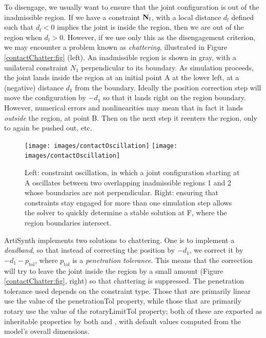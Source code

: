 To disengage, we usually want to ensure that the joint configuration
is out of the inadmissible region. If we have a constraint ${\bf N}_l$,
with a local distance $d_l$ defined such that $d_l < 0$ implies the
joint is inside the region, then we are out of the region when
$d_l > 0$.  However, if we use only this as the disengagement
criterion, we may encounter a problem known as {\it chattering},
illustrated in Figure \ref{contactChatter:fig} (left). An inadmissible
region is shown in gray, with a unilateral constraint $N_1$
perpendicular to its boundary. As simulation proceeds, the joint lands
inside the region at an initial point A at the lower left, at a
(negative) distance $d_1$ from the boundary. Ideally the position
correction step will move the configuration by $-d_1$ so that it lands
right on the region boundary. However, numerical errors and
nonlinearities may mean that in fact it lands {\it outside} the
region, at point B. Then on the next step it reenters the region, only
to again be pushed out, etc.

\begin{figure}[th]
\begin{center}
\iflatexml
 \texttt{[image: images/contactOscillation]}
\else
 \texttt{[image: images/contactOscillation]}
\fi
\end{center}
\caption{Left: constraint oscillation, in which a joint configuration
starting at A oscillates between two overlapping inadmissible
regions 1 and 2 whose boundaries are not perpendicular. Right:
ensuring that constraints stay engaged for more than one simulation
step allows the solver to quickly determine a stable solution at F,
where the region boundaries intersect.}
\label{contactOscillation:fig}
\end{figure}

ArtiSynth implements two solutions to chattering. One is to implement
a {\it deadband}, so that instead of correcting the position by
$-d_1$, we correct it by $-d_1 - p_\text{tol}$, where $p_\text{tol}$
is a {\it penetration tolerance}. This means that the correction will
try to leave the joint inside the region by a small amount (Figure
\ref{contactChatter:fig}, right) so that chattering is suppressed. The
penetration tolerance used depends on the constraint type. Those that
are primarily linear use the value of the {\sf penetrationTol}
property, while those that are primarily rotary use the value of the
{\sf rotaryLimitTol} property; both of these are exported as
inheritable properties by both
 and
, with default
values computed from the model's overall dimensions.


